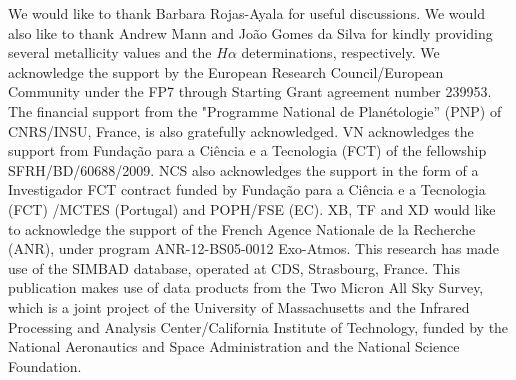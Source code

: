 \documentclass{aa}
\begin{document}
\begin{acknowledgements}
We would like to thank Barbara Rojas-Ayala for useful discussions. We would also like to thank Andrew Mann and Jo\~ao Gomes da Silva for kindly providing several metallicity values and the $H\alpha$ determinations, respectively. We acknowledge the support by the European Research Council/European Community under the FP7 through Starting Grant agreement number 239953. The financial support from the "Programme National de Plan\'etologie'' (PNP) of CNRS/INSU, France, is also gratefully acknowledged. VN acknowledges the support from Funda\c{c}\~ao para a Ci\^encia e a Tecnologia (FCT) of the fellowship SFRH/BD/60688/2009. NCS also acknowledges the support in the form of a Investigador FCT contract funded by Funda\c{c}\~ao para a Ci\^encia e a Tecnologia (FCT) /MCTES (Portugal) and POPH/FSE (EC). XB, TF and XD would like to acknowledge the support of the French Agence Nationale de la Recherche (ANR), under program ANR-12-BS05-0012 Exo-Atmos. This research has made use of the SIMBAD database, operated at CDS, Strasbourg, France. This publication makes use of data products from the Two Micron All Sky Survey, which is a joint project of the University of Massachusetts and the Infrared Processing and Analysis Center/California Institute of Technology, funded by the National Aeronautics and Space Administration and the National Science Foundation.

\end{acknowledgements}
\end{document}
